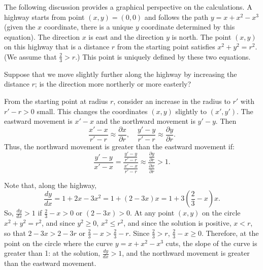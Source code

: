 \begin{original}
The following discussion provides a graphical perspective on the calculations. A highway starts from point $(x, y) = (0,0)$ and follows the path $y = x + x^2 - x^3$ (given the $x$ coordinate, there is a unique $y$ coordinate determined by this equation). The direction $x$ is east and the direction $y$ is north. The point $(x, y)$ on this highway that is a distance $r$ from the starting point satisfies $x^2 + y^2 = r^2$. (We assume that $\frac{2}{3} > r$.) This point is uniquely defined by these two equations.

Suppose that we move slightly further along the highway by increasing the distance $r$; is the direction more northerly or more easterly?

From the starting point at radius $r$, consider an increase in the radius to $r'$ with $r' - r > 0$ small. This changes the coordinates $(x, y)$ slightly to $(x', y')$. The eastward movement is $x' - x$ and the northward movement is $y' - y$. Then
\[
\frac{x' - x}{r' - r} \approx \frac{\partial x}{\partial r}, \quad \frac{y' - y}{r' - r} \approx \frac{\partial y}{\partial r}.
\]
Thus, the northward movement is greater than the eastward movement if:
\[
\frac{y' - y}{x' - x} = \frac{\frac{y'-y}{r'-r}}{\frac{x'-x}{r'-r}} \approx \frac{\frac{\partial y}{\partial r}}{\frac{\partial x}{\partial r}} > 1.
\]

Note that, along the highway,
\[
\frac{dy}{dx} = 1 + 2x - 3x^2 = 1 + (2 - 3x)x = 1 + 3\!\left(\frac{2}{3} - x\right)\!x.
\]
So, $\frac{dy}{dx} > 1$ if $\frac{2}{3} - x > 0$ or $(2 - 3x) > 0$. At any point $(x, y)$ on the circle $x^2 + y^2 = r^2$, and since $y^2 \ge 0$, $x^2 \le r^2$, and since the solution is positive, $x < r$, so that $2 - 3x > 2 - 3r$ or $\frac{2}{3} - x > \frac{2}{3} - r$. Since $\frac{2}{3} > r$, $\frac{2}{3} - x \ge 0$. Therefore, at the point on the circle where the curve $y = x + x^2 - x^3$ cuts, the slope of the curve is greater than 1: at the solution, $\frac{dy}{dx} > 1$, and the northward movement is greater than the eastward movement.
\end{original}
